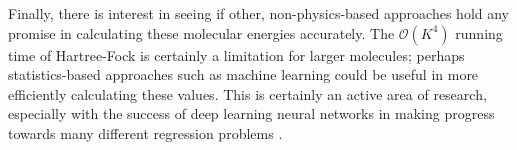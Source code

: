 \documentclass[12pt]{article}
\newcommand{\Oh}{\mathcal{O}}
\begin{document}
Finally, there is interest in seeing if other, non-physics-based approaches hold any promise in calculating these molecular energies accurately.  The $\Oh(K^4)$ running time of Hartree-Fock is certainly a limitation for larger molecules; perhaps statistics-based approaches such as machine learning could be useful in more efficiently calculating these values.  This is certainly an active area of research, especially with the success of deep learning neural networks in making progress towards many different regression problems \cite{montavon2012, montavon2013, rupp2012, mills2017}.  
  


\end{document}
